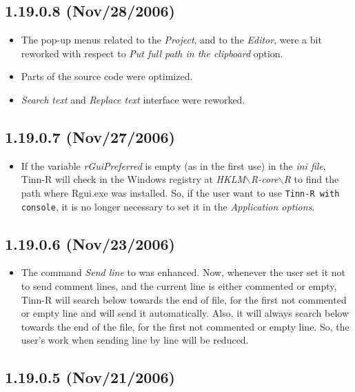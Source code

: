 \subsection{1.19.0.8 (Nov/28/2006)}

\begin{itemize}
  \item The pop-up menus related to the \textit{Project}, and to the
    \textit{Editor}, were a bit reworked with respect to \textit{Put
      full path in the clipboard} option.
  \item Parts of the source code were optimized.
  \item \textit{Search text} and \textit{Replace text} interface were
    reworked.
\end{itemize}


\subsection{1.19.0.7 (Nov/27/2006)}

\begin{itemize}
  \item If the variable \textit{rGuiPreferred} is empty (as in the first use)
    in the \textit{ini file}, Tinn-R will check in the Windows registry at
    \textit{HKLM$\backslash$R-core$\backslash$R} to find the path where
    Rgui.exe was installed. So, if the user want to use \texttt{Tinn-R with
      \RR{} console}, it is no longer necessary to set it in the
    \textit{Application options}.
\end{itemize}


\subsection{1.19.0.6 (Nov/23/2006)}

\begin{itemize}
  \item The command \textit{Send line} to \RR{} was enhanced. Now, whenever
    the user set it not to send comment lines, and the current line is either
    commented or empty, Tinn-R will search below towards the end of file, for
    the first not commented or empty line and will send it automatically.
    Also, it will always search below towards the end of the file, for the first
    not commented or empty line. So, the user's work when
    sending line by line will be reduced.
\end{itemize}


\subsection{1.19.0.5 (Nov/21/2006)}

